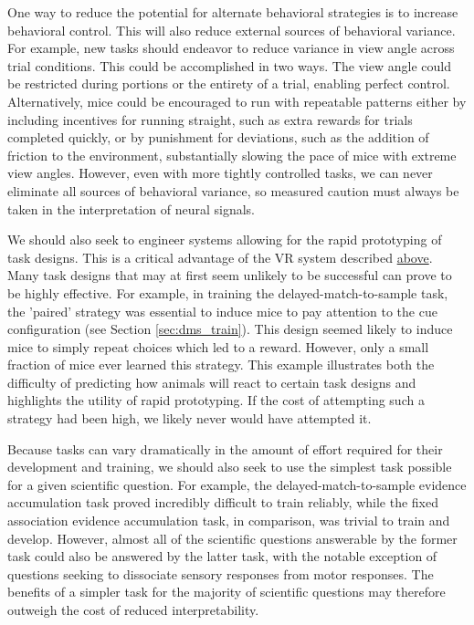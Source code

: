 \bigskip
One way to reduce the potential for alternate behavioral strategies is to increase behavioral control. This will also reduce external sources of behavioral variance. For example, new tasks should endeavor to reduce variance in view angle across trial conditions. This could be accomplished in two ways. The view angle could be restricted during portions or the entirety of a trial, enabling perfect control. Alternatively, mice could be encouraged to run with repeatable patterns either by including incentives for running straight, such as extra rewards for trials completed quickly, or by punishment for deviations, such as the addition of friction to the environment, substantially slowing the pace of mice with extreme view angles. However, even with more tightly controlled tasks, we can never eliminate all sources of behavioral variance, so measured caution must always be taken in the interpretation of neural signals.

\bigskip
We should also seek to engineer systems allowing for the rapid prototyping of task designs. This is a critical advantage of the VR system described \hyperref[sec:vr]{above}. Many task designs that may at first seem unlikely to be successful can prove to be highly effective. For example, in training the delayed-match-to-sample task, the 'paired' strategy was essential to induce mice to pay attention to the cue configuration (see Section \ref{sec:dms_train}). This design seemed likely to induce mice to simply repeat choices which led to a reward. However, only a small fraction of mice ever learned this strategy. This example illustrates both the difficulty of predicting how animals will react to certain task designs and highlights the utility of rapid prototyping. If the cost of attempting such a strategy had been high, we likely never would have attempted it. 

\bigskip
Because tasks can vary dramatically in the amount of effort required for their development and training, we should also seek to use the simplest task possible for a given scientific question. For example, the delayed-match-to-sample evidence accumulation task proved incredibly difficult to train reliably, while the fixed association evidence accumulation task, in comparison, was trivial to train and develop. However, almost all of the scientific questions answerable by the former task could also be answered by the latter task, with the notable exception of questions seeking to dissociate sensory responses from motor responses. The benefits of a simpler task for the majority of scientific questions may therefore outweigh the cost of reduced interpretability.



